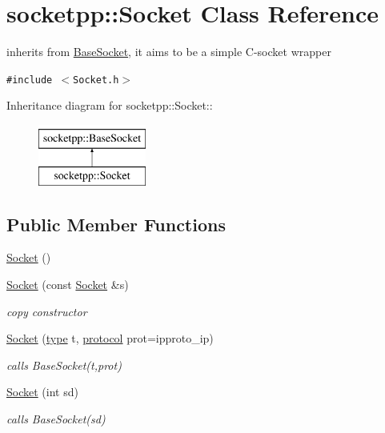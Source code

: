 \hypertarget{classsocketpp_1_1Socket}{
\section{socketpp::Socket Class Reference}
\label{classsocketpp_1_1Socket}
}
inherits from \hyperlink{classsocketpp_1_1BaseSocket}{BaseSocket}, it aims to be a simple C-socket wrapper  


{\tt \#include $<$Socket.h$>$}

Inheritance diagram for socketpp::Socket::\begin{figure}[H]
\begin{center}
\leavevmode
\includegraphics[height=2cm]{classsocketpp_1_1Socket}
\end{center}
\end{figure}
\subsection*{Public Member Functions}
\begin{CompactItemize}
\item 
\hyperlink{classsocketpp_1_1Socket_6e64543f53184332b55289935f2fd35d}{Socket} ()
\item 
\hyperlink{classsocketpp_1_1Socket_799a836f2ceab366ab11ae234970d951}{Socket} (const \hyperlink{classsocketpp_1_1Socket}{Socket} \&s)
\begin{CompactList}\small\item\em copy constructor \item\end{CompactList}\item 
\hyperlink{classsocketpp_1_1Socket_c10e4f533ed78a3d898c1fe0cea09cef}{Socket} (\hyperlink{namespacesocketpp_635f4c3b3f85aba331587404d59ae52d}{type} t, \hyperlink{namespacesocketpp_2969678def1c6c8cb4102802ca82e2cf}{protocol} prot=ipproto\_\-ip)
\begin{CompactList}\small\item\em calls BaseSocket(t,prot) \item\end{CompactList}\item 
\hyperlink{classsocketpp_1_1Socket_2ec875f75becab573f7720d50ab13c99}{Socket} (int sd)
\begin{CompactList}\small\item\em calls BaseSocket(sd) \item\end{CompactList}\end{CompactItemize}


